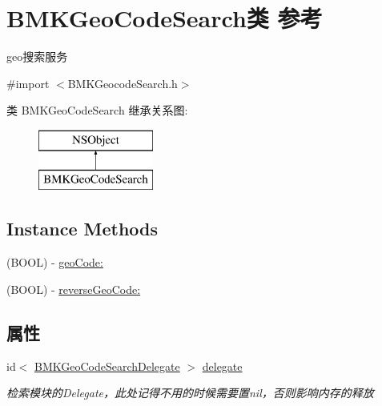 \hypertarget{interface_b_m_k_geo_code_search}{}\section{B\+M\+K\+Geo\+Code\+Search类 参考}
\label{interface_b_m_k_geo_code_search}


geo搜索服务  




{\ttfamily \#import $<$B\+M\+K\+Geocode\+Search.\+h$>$}

类 B\+M\+K\+Geo\+Code\+Search 继承关系图\+:\begin{figure}[H]
\begin{center}
\leavevmode
\includegraphics[height=2.000000cm]{interface_b_m_k_geo_code_search}
\end{center}
\end{figure}
\subsection*{Instance Methods}
\begin{DoxyCompactItemize}
\item 
(B\+O\+O\+L) -\/ \hyperlink{interface_b_m_k_geo_code_search_a48248533fdf98ee24679d97716f6d55b}{geo\+Code\+:}
\item 
(B\+O\+O\+L) -\/ \hyperlink{interface_b_m_k_geo_code_search_a3594336ed6a95074f069b4d0ebc75df2}{reverse\+Geo\+Code\+:}
\end{DoxyCompactItemize}
\subsection*{属性}
\begin{DoxyCompactItemize}
\item 
\hypertarget{interface_b_m_k_geo_code_search_a7a816dcf6d4f679ad3287948ad9427d2}{}id$<$ \hyperlink{protocol_b_m_k_geo_code_search_delegate-p}{B\+M\+K\+Geo\+Code\+Search\+Delegate} $>$ \hyperlink{interface_b_m_k_geo_code_search_a7a816dcf6d4f679ad3287948ad9427d2}{delegate}\label{interface_b_m_k_geo_code_search_a7a816dcf6d4f679ad3287948ad9427d2}

\begin{DoxyCompactList}\small\item\em 检索模块的\+Delegate，此处记得不用的时候需要置nil，否则影响内存的释放 \end{DoxyCompactList}\end{DoxyCompactItemize}



